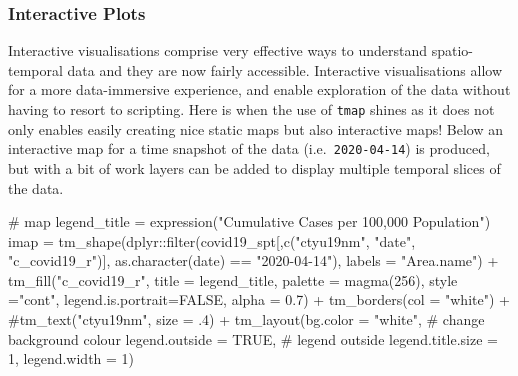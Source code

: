 \documentclass[
  letterpaper,
  krantz2]{style/krantz}
\newenvironment{Shaded}{\begin{snugshade}}{\end{snugshade}}
\newcommand{\AttributeTok}[1]{\textcolor[rgb]{0.40,0.45,0.13}{#1}}
\newcommand{\CommentTok}[1]{\textcolor[rgb]{0.37,0.37,0.37}{#1}}
\newcommand{\ConstantTok}[1]{\textcolor[rgb]{0.56,0.35,0.01}{#1}}
\newcommand{\DecValTok}[1]{\textcolor[rgb]{0.68,0.00,0.00}{#1}}
\newcommand{\FloatTok}[1]{\textcolor[rgb]{0.68,0.00,0.00}{#1}}
\newcommand{\FunctionTok}[1]{\textcolor[rgb]{0.28,0.35,0.67}{#1}}
\newcommand{\NormalTok}[1]{\textcolor[rgb]{0.00,0.23,0.31}{#1}}
\newcommand{\OtherTok}[1]{\textcolor[rgb]{0.00,0.23,0.31}{#1}}
\newcommand{\SpecialCharTok}[1]{\textcolor[rgb]{0.37,0.37,0.37}{#1}}
\newcommand{\StringTok}[1]{\textcolor[rgb]{0.13,0.47,0.30}{#1}}
\begin{document}
\hypertarget{interactive-plots}{%
\subsubsection{Interactive Plots}\label{interactive-plots}}

Interactive visualisations comprise very effective ways to understand
spatio-temporal data and they are now fairly accessible. Interactive
visualisations allow for a more data-immersive experience, and enable
exploration of the data without having to resort to scripting. Here is
when the use of \texttt{tmap} shines as it does not only enables easily
creating nice static maps but also interactive maps! Below an
interactive map for a time snapshot of the data
(i.e.~\texttt{2020-04-14}) is produced, but with a bit of work layers
can be added to display multiple temporal slices of the data.

\begin{Shaded}
\begin{Highlighting}[]
\CommentTok{\# map}
\NormalTok{legend\_title }\OtherTok{=} \FunctionTok{expression}\NormalTok{(}\StringTok{"Cumulative Cases per 100,000 Population"}\NormalTok{)}
\NormalTok{imap }\OtherTok{=} \FunctionTok{tm\_shape}\NormalTok{(dplyr}\SpecialCharTok{::}\FunctionTok{filter}\NormalTok{(covid19\_spt[,}\FunctionTok{c}\NormalTok{(}\StringTok{"ctyu19nm"}\NormalTok{, }\StringTok{"date"}\NormalTok{, }\StringTok{"c\_covid19\_r"}\NormalTok{)], }\FunctionTok{as.character}\NormalTok{(date) }\SpecialCharTok{==} \StringTok{"2020{-}04{-}14"}\NormalTok{), }\AttributeTok{labels =} \StringTok{"Area.name"}\NormalTok{) }\SpecialCharTok{+}
  \FunctionTok{tm\_fill}\NormalTok{(}\StringTok{"c\_covid19\_r"}\NormalTok{, }\AttributeTok{title =}\NormalTok{ legend\_title, }\AttributeTok{palette =} \FunctionTok{magma}\NormalTok{(}\DecValTok{256}\NormalTok{), }\AttributeTok{style =}\StringTok{"cont"}\NormalTok{, }\AttributeTok{legend.is.portrait=}\ConstantTok{FALSE}\NormalTok{, }\AttributeTok{alpha =} \FloatTok{0.7}\NormalTok{) }\SpecialCharTok{+}
  \FunctionTok{tm\_borders}\NormalTok{(}\AttributeTok{col =} \StringTok{"white"}\NormalTok{) }\SpecialCharTok{+}
  \CommentTok{\#tm\_text("ctyu19nm", size = .4) +}
  \FunctionTok{tm\_layout}\NormalTok{(}\AttributeTok{bg.color =} \StringTok{"white"}\NormalTok{, }\CommentTok{\# change background colour}
            \AttributeTok{legend.outside =} \ConstantTok{TRUE}\NormalTok{, }\CommentTok{\# legend outside}
            \AttributeTok{legend.title.size =} \DecValTok{1}\NormalTok{,}
            \AttributeTok{legend.width =} \DecValTok{1}\NormalTok{) }
\end{Highlighting}
\end{Shaded}
\end{document}
